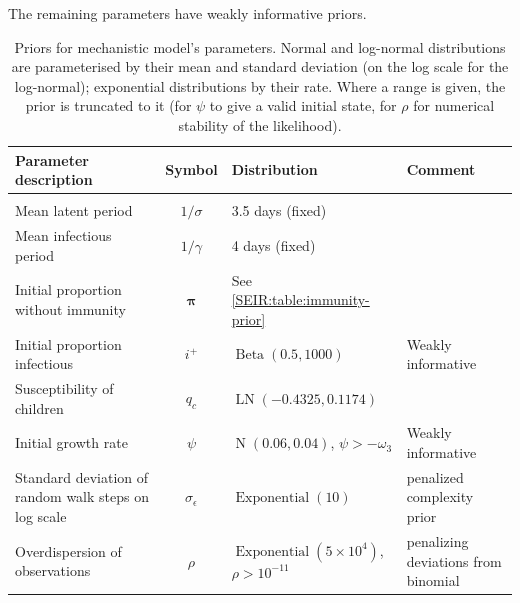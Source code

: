 \documentclass[9pt,twocolumn,twoside]{pnas-new}
\DeclareMathOperator{\N}{N}
\DeclareMathOperator{\BetaDist}{Beta}
\DeclareMathOperator{\Exponential}{Exponential}
\DeclareMathOperator{\LN}{LN}
\renewcommand{\vec}[1]{\bm{#1}}
\begin{document}
The remaining parameters have weakly informative priors.

\begin{table}
\begin{tabular}{l c l l}
    Parameter description & Symbol & Distribution & Comment \\
    \hline \\
    Mean latent period & $1/\sigma$ & 3.5 days (fixed) & \citep{zhaoEstimating} \\
    Mean infectious period & $1/\gamma$ & 4 days (fixed) & \citep{zhaoEstimating} \\
    Initial proportion without immunity & $\vec\pi$ & See \cref{SEIR:table:immunity-prior} & \\
    Initial proportion infectious & $i^+$ & $\BetaDist(0.5, 1000)$ & Weakly informative \\
    Susceptibility of children & $q_c$ & $\LN(-0.4325, 0.1174)$ & \citep{vinerTransmission}  \\
    Initial growth rate & $\psi$ & $\N(0.06, 0.04)$, $\psi > -\omega_3$ & Weakly informative \\
    Standard deviation of random walk steps on log scale & $\sigma_\epsilon$ & $\Exponential(10)$ & penalized complexity prior~\citep{simpsonPenalising} \\
    Overdispersion of observations & $\rho$ & $\Exponential(5 \times 10^4)$, $\rho > 10^{-11}$ & penalizing deviations from binomial
\end{tabular}
\caption{Priors for mechanistic model's parameters. Normal and log-normal distributions are parameterised by their mean and standard deviation (on the log scale for the log-normal); exponential distributions by their rate. Where a range is given, the prior is truncated to it (for $\psi$ to give a valid initial state, for $\rho$ for numerical stability of the likelihood).}
\label{table:mech-priors}
\end{table}
\end{document}
